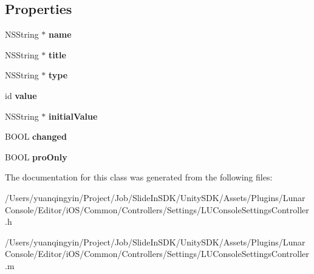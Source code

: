 \subsection*{Properties}
\begin{DoxyCompactItemize}
\item 
\mbox{\label{interface_l_u_console_settings_entry_aa3d89f67832d94447e8bceff80eddabb}} 
N\+S\+String $\ast$ {\bfseries name}
\item 
\mbox{\label{interface_l_u_console_settings_entry_acb79d81e0fcd3597f7bbe9b72a06d60c}} 
N\+S\+String $\ast$ {\bfseries title}
\item 
\mbox{\label{interface_l_u_console_settings_entry_afa59587f2c31b038150953643c866c05}} 
N\+S\+String $\ast$ {\bfseries type}
\item 
\mbox{\label{interface_l_u_console_settings_entry_af11a5326932d21ef6b71b968714cd042}} 
id {\bfseries value}
\item 
\mbox{\label{interface_l_u_console_settings_entry_aab57b80ce60b0011c6f438eb89abbb44}} 
N\+S\+String $\ast$ {\bfseries initial\+Value}
\item 
\mbox{\label{interface_l_u_console_settings_entry_ab646cd75bac841d6b514d42fabed670f}} 
B\+O\+OL {\bfseries changed}
\item 
\mbox{\label{interface_l_u_console_settings_entry_aa75a0c96de5b66a3818eaf09cf509d04}} 
B\+O\+OL {\bfseries pro\+Only}
\end{DoxyCompactItemize}


The documentation for this class was generated from the following files\+:\begin{DoxyCompactItemize}
\item 
/\+Users/yuanqingyin/\+Project/\+Job/\+Slide\+In\+S\+D\+K/\+Unity\+S\+D\+K/\+Assets/\+Plugins/\+Lunar\+Console/\+Editor/i\+O\+S/\+Common/\+Controllers/\+Settings/L\+U\+Console\+Settings\+Controller.\+h\item 
/\+Users/yuanqingyin/\+Project/\+Job/\+Slide\+In\+S\+D\+K/\+Unity\+S\+D\+K/\+Assets/\+Plugins/\+Lunar\+Console/\+Editor/i\+O\+S/\+Common/\+Controllers/\+Settings/L\+U\+Console\+Settings\+Controller.\+m\end{DoxyCompactItemize}
